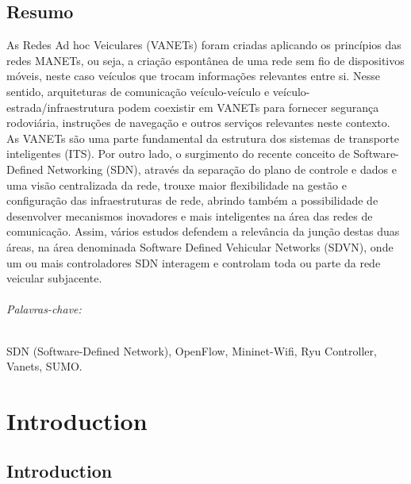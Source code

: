 \documentclass[
  oneside,
  11pt, a4paper,
  footinclude=true,
  headinclude=true,
  cleardoublepage=empty
]{scrbook}
\begin{document}
\chapter*{Resumo}
As Redes Ad hoc Veiculares (VANETs) foram criadas aplicando os princípios das redes MANETs, ou seja, a criação espontânea de uma rede sem fio de dispositivos móveis, neste caso veículos que trocam informações relevantes entre si. Nesse sentido, arquiteturas de comunicação veículo-veículo e veículo-estrada/infraestrutura podem coexistir em VANETs para fornecer segurança rodoviária, instruções de navegação e outros serviços relevantes neste contexto. As VANETs são uma parte fundamental da estrutura dos sistemas de transporte inteligentes (ITS).
Por outro lado, o surgimento do recente conceito de Software-Defined Networking (SDN), através da separação do plano de controle e dados e uma visão centralizada da rede, trouxe maior flexibilidade na gestão e configuração das infraestruturas de rede, abrindo também a possibilidade de desenvolver mecanismos inovadores e mais inteligentes na área das redes de comunicação. Assim, vários estudos defendem a relevância da junção destas duas áreas, na área denominada Software Defined Vehicular Networks (SDVN), onde um ou mais controladores SDN interagem e controlam toda ou parte da rede veicular subjacente. 

\paragraph{Palavras-chave:} SDN (Software-Defined Network), OpenFlow, Mininet-Wifi, Ryu Controller, Vanets, SUMO.


	\cleardoublepage
	
	\setcounter{page}{3}
	
	\cleardoublepage
	\tableofcontents
	
	\cleardoublepage
	\listoffigures
	
	\cleardoublepage
	\listoftables
	
	\cleardoublepage
	\lstlistoflistings
	
	\cleardoublepage
	\setcounter{page}{3}


\part{Introduction}
\chapter{Introduction}
	
\end{document}
